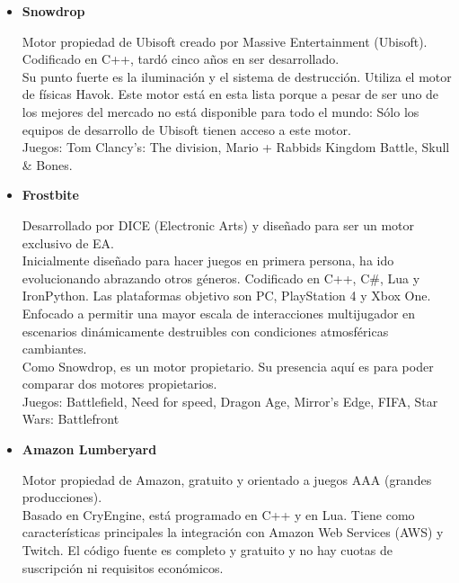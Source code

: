 \begin{itemize}
\item{\textbf{Snowdrop}}

\quad Motor propiedad de Ubisoft creado por Massive Entertainment (Ubisoft). Codificado en C++, tardó cinco años en ser desarrollado.\\

\quad Su punto fuerte es la iluminación y el sistema de destrucción. Utiliza el motor de físicas Havok. Este motor está en esta lista porque a pesar de ser uno de los mejores del mercado no está disponible para todo el mundo: Sólo los equipos de desarrollo de Ubisoft tienen acceso a este motor.\\

\quad Juegos: Tom Clancy's: The division, Mario + Rabbids Kingdom Battle, Skull \& Bones.\\

\item{\textbf{Frostbite}}

\quad Desarrollado por DICE (Electronic Arts) y diseñado para ser un motor exclusivo de EA. \\

\quad Inicialmente diseñado para hacer juegos en primera persona, ha ido evolucionando abrazando otros géneros. Codificado en C++, C\#, Lua y IronPython. Las plataformas objetivo son PC, PlayStation 4 y Xbox One. Enfocado a permitir una mayor escala de interacciones multijugador en escenarios dinámicamente destruibles con condiciones atmosféricas cambiantes. \\

\quad Como Snowdrop, es un motor propietario. Su presencia aquí es para poder comparar dos motores propietarios. \\

\quad Juegos: Battlefield, Need for speed, Dragon Age, Mirror's Edge, FIFA, Star Wars: Battlefront\\

\item{\textbf{Amazon Lumberyard}}

\quad Motor propiedad de Amazon, gratuito y orientado a juegos AAA (grandes producciones). \\

\quad Basado en CryEngine, está programado en C++ y en Lua. Tiene como características principales la integración con Amazon Web Services (AWS) y Twitch. El código fuente es completo y gratuito y no hay cuotas de suscripción ni requisitos económicos. \\


\end{itemize}
